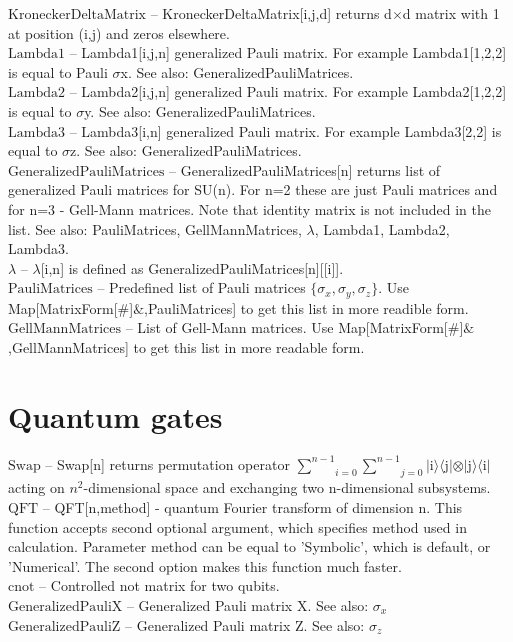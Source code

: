 \documentclass[a4paper,10pt]{scrartcl}
\begin{document}
\noindent\textbf{$ \text{KroneckerDeltaMatrix} $ }-- KroneckerDeltaMatrix[i,j,d] returns d$\times $d matrix with 1 at position (i,j) and zeros elsewhere.$  $\\[8pt]
\noindent\textbf{$ \text{Lambda1} $ }-- Lambda1[i,j,n] generalized Pauli matrix. For example Lambda1[1,2,2] is equal to Pauli $\sigma $x. See also: GeneralizedPauliMatrices.$  $\\[8pt]
\noindent\textbf{$ \text{Lambda2} $ }-- Lambda2[i,j,n] generalized Pauli matrix. For example Lambda2[1,2,2] is equal to $\sigma $y. See also: GeneralizedPauliMatrices.$  $\\[8pt]
\noindent\textbf{$ \text{Lambda3} $ }-- Lambda3[i,n] generalized Pauli matrix. For example Lambda3[2,2] is equal to $\sigma $z. See also: GeneralizedPauliMatrices.$  $\\[8pt]
\noindent\textbf{$ \text{GeneralizedPauliMatrices} $ }-- GeneralizedPauliMatrices[n] returns list of generalized Pauli matrices for SU(n). For n=2 these are just Pauli matrices and for n=3 - Gell-Mann matrices. Note that identity matrix is not included in the list. See also: PauliMatrices, GellMannMatrices, $\lambda $, Lambda1, Lambda2, Lambda3.$  $\\[8pt]
\noindent\textbf{$ \lambda  $ }-- $\lambda $[i,n] is defined as GeneralizedPauliMatrices[n][[i]].$  $\\[8pt]
\noindent\textbf{$ \text{PauliMatrices} $ }-- Predefined list of Pauli matrices $\{$$ \sigma _x,\sigma _y,\sigma _z $$\}$. Use Map[MatrixForm[$\#$]$\&$,PauliMatrices] to get this list in more readible form.$  $\\[8pt]
\noindent\textbf{$ \text{GellMannMatrices} $ }-- List of Gell-Mann matrices. Use Map[MatrixForm[$\#$]$\&$,GellMannMatrices] to get this list in more readable form.$  $\\[8pt]
\section{Quantum gates}

\noindent\textbf{$ \text{Swap} $ }-- Swap[n] returns permutation operator $ \underset{i=0}{\overset{n-1}{ \sum }}\underset{j=0}{\overset{n-1}{ \sum }} $$|$i$\rangle \langle $j$|\otimes |$j$\rangle \langle $i$|$ acting on $ n^2 $-dimensional space and exchanging two n-dimensional subsystems.$  $\\[8pt]
\noindent\textbf{$ \text{QFT} $ }-- QFT[n,method] - quantum Fourier transform of dimension n. This function accepts second optional argument, which specifies method used in calculation. Parameter method can be equal to 'Symbolic', which is default, or 'Numerical'. The second option makes this function much faster.$  $\\[8pt]
\noindent\textbf{$ \text{cnot} $ }-- Controlled not matrix for two qubits.$  $\\[8pt]
\noindent\textbf{$ \text{GeneralizedPauliX} $ }-- Generalized Pauli matrix X. See also: $ \sigma _x $\\[8pt]
\noindent\textbf{$ \text{GeneralizedPauliZ} $ }-- Generalized Pauli matrix Z. See also: $ \sigma _z $\\[8pt]
\end{document}
